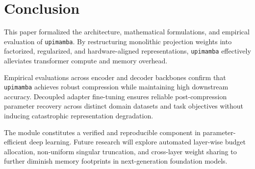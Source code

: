 \section{Conclusion}
This paper formalized the architecture, mathematical formulations, and empirical evaluation of \texttt{upimamba}. By restructuring monolithic projection weights into factorized, regularized, and hardware-aligned representations, \texttt{upimamba} effectively alleviates transformer compute and memory overhead.

Empirical evaluations across encoder and decoder backbones confirm that \texttt{upimamba} achieves robust compression while maintaining high downstream accuracy. Decoupled adapter fine-tuning ensures reliable post-compression parameter recovery across distinct domain datasets and task objectives without inducing catastrophic representation degradation.

The module constitutes a verified and reproducible component in parameter-efficient deep learning. Future research will explore automated layer-wise budget allocation, non-uniform singular truncation, and cross-layer weight sharing to further diminish memory footprints in next-generation foundation models.
